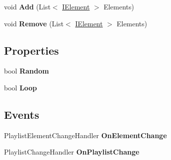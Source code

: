 \begin{DoxyCompactItemize}
\item 
\hypertarget{class_media_motion_1_1_modules_1_1_components_1_1_playlist_1_1_playlist_a3c61725444e5553d60d788dfabdcac8c}{void {\bfseries Add} (List$<$ \hyperlink{interface_media_motion_1_1_core_1_1_models_1_1_interfaces_1_1_i_element}{I\+Element} $>$ Elements)}\label{class_media_motion_1_1_modules_1_1_components_1_1_playlist_1_1_playlist_a3c61725444e5553d60d788dfabdcac8c}

\item 
\hypertarget{class_media_motion_1_1_modules_1_1_components_1_1_playlist_1_1_playlist_af7bd8105e1063e49bd9ef7afde1fe329}{void {\bfseries Remove} (List$<$ \hyperlink{interface_media_motion_1_1_core_1_1_models_1_1_interfaces_1_1_i_element}{I\+Element} $>$ Elements)}\label{class_media_motion_1_1_modules_1_1_components_1_1_playlist_1_1_playlist_af7bd8105e1063e49bd9ef7afde1fe329}

\end{DoxyCompactItemize}
\subsection*{Properties}
\begin{DoxyCompactItemize}
\item 
\hypertarget{class_media_motion_1_1_modules_1_1_components_1_1_playlist_1_1_playlist_ac293f0b3e77b15d3eb60747f75c29ba4}{bool {\bfseries Random}}\label{class_media_motion_1_1_modules_1_1_components_1_1_playlist_1_1_playlist_ac293f0b3e77b15d3eb60747f75c29ba4}

\item 
\hypertarget{class_media_motion_1_1_modules_1_1_components_1_1_playlist_1_1_playlist_a393cb97cede7dc4b3b624b9e51c2a32a}{bool {\bfseries Loop}}\label{class_media_motion_1_1_modules_1_1_components_1_1_playlist_1_1_playlist_a393cb97cede7dc4b3b624b9e51c2a32a}

\end{DoxyCompactItemize}
\subsection*{Events}
\begin{DoxyCompactItemize}
\item 
\hypertarget{class_media_motion_1_1_modules_1_1_components_1_1_playlist_1_1_playlist_acd79347d70f2e77035bc1475b8928b5c}{Playlist\+Element\+Change\+Handler {\bfseries On\+Element\+Change}}\label{class_media_motion_1_1_modules_1_1_components_1_1_playlist_1_1_playlist_acd79347d70f2e77035bc1475b8928b5c}

\item 
\hypertarget{class_media_motion_1_1_modules_1_1_components_1_1_playlist_1_1_playlist_a1d84b782096b8cadd6ef68f64dec80e3}{Playlist\+Change\+Handler {\bfseries On\+Playlist\+Change}}\label{class_media_motion_1_1_modules_1_1_components_1_1_playlist_1_1_playlist_a1d84b782096b8cadd6ef68f64dec80e3}

\end{DoxyCompactItemize}


